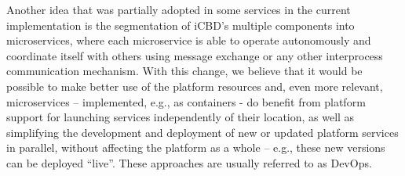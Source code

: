 Another idea that was partially adopted in some services in the current implementation is the segmentation of iCBD’s multiple components into microservices, where each microservice is able to operate autonomously and coordinate itself with others using message exchange or any other interprocess communication mechanism. With this change, we believe that it would be possible to make better use of the platform resources and, even more relevant, microservices – implemented, e.g., as containers - do benefit from platform support for launching services independently of their location, as well as simplifying the development and deployment of new or updated platform services in parallel, without affecting the platform as a whole – e.g., these new versions can be deployed “live”. These approaches are usually referred to as DevOps.









